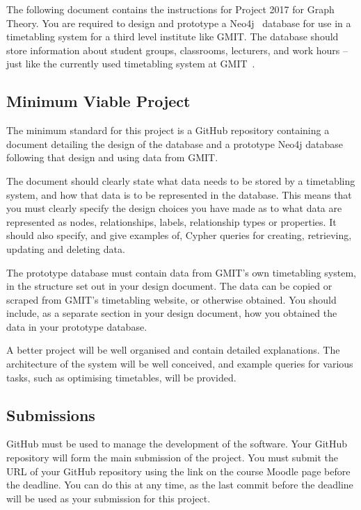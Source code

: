 \documentclass[12pt, a4paper]{article}
\title{\projectname}
\author{\modulename}
\date{Due: \duedate}
\newcommand{\modulename}{Graph Theory}
\newcommand{\projectyear}{2017}
\newcommand{\projectname}{Project \projectyear}
\begin{document}
\maketitle

\noindent
The following document contains the instructions for \projectname{} for \modulename{}.
You are required to design and prototype a Neo4j~\cite{neo4jwebsite} database for use in a timetabling system for a third level institute like GMIT.
The database should store information about student groups, classrooms, lecturers, and work hours -- just like the currently used timetabling system at GMIT~\cite{gmitttwebsite}.

\subsection*{Minimum Viable Project}
The minimum standard for this project is a GitHub repository containing a document detailing the design of the database and a prototype Neo4j database following that design and using data from GMIT.

The document should clearly state what data needs to be stored by a timetabling system, and how that data is to be represented in the database.
This means that you must clearly specify the design choices you have made as to what data are represented as nodes, relationships, labels, relationship types or properties.
It should also specify, and give examples of, Cypher queries for creating, retrieving, updating and deleting data.

The prototype database must contain data from GMIT's own timetabling system, in the structure set out in your design document.
The data can be copied or scraped from GMIT's timetabling website, or otherwise obtained.
You should include, as a separate section in your design document, how you obtained the data in your prototype database.

A better project will be well organised and contain detailed explanations.
The architecture of the system will be well conceived, and example queries for various tasks, such as optimising timetables, will be provided.


\subsection*{Submissions}
GitHub must be used to manage the development of the software.
Your GitHub repository will form the main submission of the project.
You must submit the URL of your GitHub repository using the link on the course Moodle page before the deadline.
You can do this at any time, as the last commit before the deadline will be used as your submission for this project.
\end{document}

